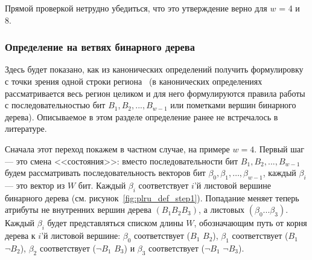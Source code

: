 Прямой проверкой нетрудно убедиться, что это утверждение верно для $w$ = 4 и 8.

\subsubsection{Определение \PseudoLRU на ветвях бинарного
дерева}\label{sec:PseudoLRUonBranches}

Здесь будет показано, как из канонических определений \PseudoLRU
получить формулировку \PseudoLRU с точки зрения одной строки региона~\cite{my_lomonosov_2010}
(в канонических определениях рассматривается весь регион целиком и
для него формулируются правила работы с последовательностью бит $B_1,
B_2, ..., B_{w{-}1}$ или пометками вершин бинарного дерева). Описываемое в этом разделе определение \PseudoLRU ранее не встречалось в литературе.

Сначала этот переход покажем в частном случае, на примере $w=4$. Первый шаг --- это
смена <<состояния>>: вместо последовательности бит $B_1, B_2, ...,
B_{w-1}$ будем рассматривать последовательность векторов бит
$\beta_0, \beta_1, \dots, \beta_{w-1}$, каждый $\beta_i$ --- это вектор из $W$ бит. Каждый $\beta_i$ соответствует $i$'й листовой вершине бинарного дерева (см. рисунок~\ref{fig:plru_def_step1}). Попадание
меняет теперь атрибуты не внутренних вершин дерева $(B_1 B_2 B_3)$, а листовых $(\beta_0 ... \beta_3)$.
Каждый $\beta_i$ будет представляться списком длины $W$, обозначающим путь от
корня дерева к $i$'й листовой вершине: $\beta_0$ соответствует
($B_1$ $B_2$), $\beta_1$ соответствует ($B_1$ $\neg B_2$), $\beta_2$
соответствует ($\neg B_1$ $B_3$) и $\beta_3$ соответствует ($\neg
B_1$ $ \neg B_3$).\\[0.5cm]

